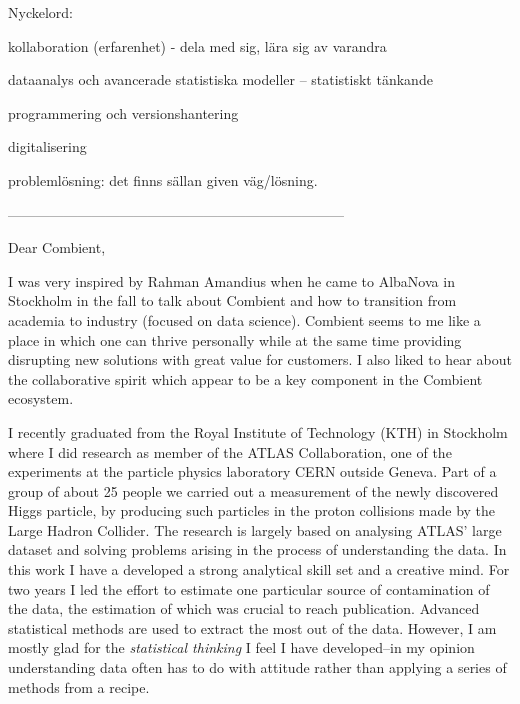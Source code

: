 \documentclass[11pt, a4paper]{../awesome-cv} %
\begin{document}
\sloppy %

\makecvheader %

\makelettertitle %


\begin{cvletter}
\vspace{.2cm}

Nyckelord: 

kollaboration (erfarenhet) - dela med sig, lära sig av varandra

dataanalys och avancerade statistiska modeller -- statistiskt tänkande

programmering och versionshantering

digitalisering 

problemlösning: det finns sällan given väg/lösning. 

------------------------------------------------------------------------

Dear Combient,

I was very inspired by Rahman Amandius when he came to AlbaNova in Stockholm in the fall to talk about Combient and how to transition from academia to industry (focused on data science).
Combient seems to me like a place in which one can thrive personally while at the same time providing disrupting new solutions with great value for customers.
I also liked to hear about the collaborative spirit which appear to be a key component in the Combient ecosystem.

I recently graduated from the Royal Institute of Technology (KTH) in Stockholm where I did research as member of the ATLAS Collaboration, one of the experiments at the particle physics laboratory CERN outside Geneva.
Part of a group of about 25 people we carried out a measurement of the newly discovered Higgs particle, by producing such particles in the proton collisions made by the Large Hadron Collider.
The research is largely based on analysing ATLAS' large dataset and solving problems arising in the process of understanding the data.
In this work I have a developed a strong analytical skill set and a creative mind. 
For two years I led the effort to estimate one particular source of contamination of the data, the estimation of which was crucial to reach publication. 
Advanced statistical methods are used to extract the most out of the data.
However, I am mostly glad for the {\it statistical thinking} I feel I have developed--in my opinion understanding data often has to do with attitude rather than applying a series of methods from a recipe.



\end{cvletter}


\makeletterclosing %
\end{document}
